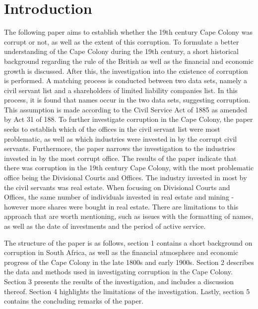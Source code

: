 \documentclass[12pt,preprint, authoryear]{elsarticle}
\numberwithin{equation}{section}
\numberwithin{figure}{section}
\numberwithin{table}{section}
\begin{document}
\pagestyle{fancy}
\chead{}
\rhead{}
\lfoot{}
\lhead{}
\cfoot{}


\headsep 35pt %




\hypertarget{introduction}{%
\section{Introduction}\label{introduction}}

The following paper aims to establish whether the 19th century Cape
Colony was corrupt or not, as well as the extent of this corruption. To
formulate a better understanding of the Cape Colony during the 19th
century, a short historical background regarding the rule of the British
as well as the financial and economic growth is discussed. After this,
the investigation into the existence of corruption is performed. A
matching process is conducted between two data sets, namely a civil
servant list and a shareholders of limited liability companies list. In
this process, it is found that names occur in the two data sets,
suggesting corruption. This assumption is made according to the Civil
Service Act of 1885 as amended by Act 31 of 188. To further investigate
corruption in the Cape Colony, the paper seeks to establish which of the
offices in the civil servant list were most problematic, as well as
which industries were invested in by the corrupt civil servants.
Furthermore, the paper narrows the investigation to the industries
invested in by the most corrupt office. The results of the paper
indicate that there was corruption in the 19th century Cape Colony, with
the most problematic office being the Divisional Courts and Offices. The
industry invested in most by the civil servants was real estate. When
focusing on Divisional Courts and Offices, the same number of
individuals invested in real estate and mining - however more shares
were bought in real estate. There are limitations to this approach that
are worth mentioning, such as issues with the formatting of names, as
well as the date of investments and the period of active service.

\newpage

The structure of the paper is as follows, section 1 contains a short
background on corruption in South Africa, as well as the financial
atmosphere and economic progress of the Cape Colony in the late 1800s
and early 1900s. Section 2 describes the data and methods used in
investigating corruption in the Cape Colony. Section 3 presents the
results of the investigation, and includes a discussion thereof. Section
4 highlights the limitations of the investigation. Lastly, section 5
contains the concluding remarks of the paper.
\end{document}
